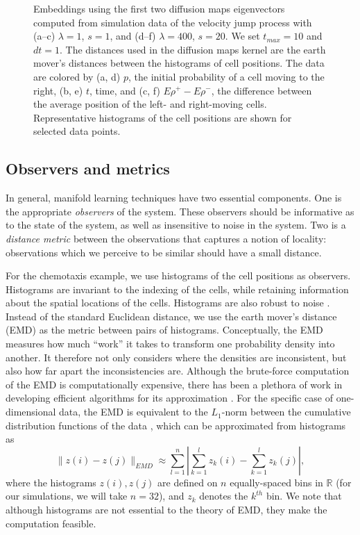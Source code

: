 \begin{figure}[t!]
\begin{subfigure}{\figwidth}
\caption{}
\label{subfig:large_lambda_rho}
\end{subfigure}
\caption{Embeddings using the first two diffusion maps eigenvectors computed from simulation data of the velocity jump process with (a--c) $\lambda=1$, $s=1$, and (d--f) $\lambda=400$, $s=20$.  We set $t_{max} = 10$ and $dt=1$. The distances used in the diffusion maps kernel are the earth mover's distances between the histograms of cell positions. The data are colored by (a, d) $p$, the initial probability of a cell moving to the right, (b, e) $t$, time, and (c, f) $E \rho^+ - E \rho^-$, the difference between the average position of the left- and right-moving cells. Representative histograms of the cell positions are shown for selected data points. }
\label{fig:dmaps_embed_emd}
\end{figure}

\subsection{Observers and metrics}

In general, manifold learning techniques have two essential components.
%
One is the appropriate {\em observers} of the system.
%
These observers should be informative as to the state of the system, as well as insensitive to noise in the system.
%
Two is a {\em distance metric} between the observations that captures a notion of locality: observations which we perceive to be similar should have a small distance.

For the chemotaxis example, we use histograms of the cell positions as observers.
%
Histograms are invariant to the indexing of the cells, while retaining information about the spatial locations of the cells.
%
Histograms are also robust to noise \cite{talmon2013empirical}.
%
Instead of the standard Euclidean distance, we use the earth mover's distance (EMD) \cite{rubner2000earth} as the metric between pairs of histograms.
%
Conceptually, the EMD measures how much ``work'' it takes to transform one probability density into another.
%
It therefore not only considers where the densities are inconsistent, but also how far apart the inconsistencies are.
%
Although the brute-force computation of the EMD is computationally expensive, there has been a plethora of work in developing efficient algorithms for its approximation \cite{Pele-eccv2008, Pele-iccv2009}.
%
For the specific case of one-dimensional data, the EMD is equivalent to the $L_1$-norm between the cumulative distribution functions of the data \cite{rubner2000perceptual}, which can be approximated from histograms as
\begin{equation}
\| z(i) - z(j) \|_{EMD} \approx \sum_{l=1}^{n} \left| \sum_{k=1}^l z_k(i) - \sum_{k=1}^l z_k(j) \right|,
\end{equation}
where the histograms $z(i), z(j)$ are defined on $n$ equally-spaced bins in $\mathbb{R}$ (for our simulations, we will take $n=32$), and $z_k$ denotes the $k^{th}$ bin.
%
We note that although histograms are not essential to the theory of EMD, they make the computation feasible.


